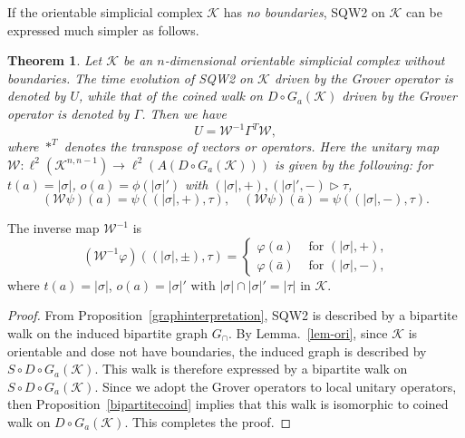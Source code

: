 \documentclass[a4paper,12pt]{article}
\newtheorem{theorem}[definition]{Theorem}
\numberwithin{equation}{section}
\begin{document}
If the orientable simplicial complex $\mathcal{K}$ has {\em no boundaries}, SQW2 on $\mathcal{K}$ can be expressed much simpler as follows.

\begin{theorem}
\label{thm-equiv-duplicate}
Let $\mathcal{K}$ be an $n$-dimensional orientable simplicial complex without boundaries. 
The time evolution of SQW2 on $\mathcal{K}$ driven by the Grover operator is denoted by $U$,
while that of the coined walk on $D\circ G_a(\mathcal{K})$ driven by the Grover operator is denoted by $\Gamma$. 
Then we have 
\begin{equation*}
U=\mathcal{W}^{-1}\Gamma^T \mathcal{W},
\end{equation*}
where $\ast^T$ denotes the transpose of vectors or operators. %
Here the unitary map $\mathcal{W}:\ell^2(\mathcal{K}^{n,n-1})\to \ell^2(A(D\circ G_a(\mathcal{K})))$ is given by the following: 
for $t(a)=|\sigma|$, $o(a)=\phi(|\sigma|')$ with $(|\sigma|,+),(|\sigma|',-) \triangleright \tau$, 
\begin{equation*} 
(\mathcal{W}\psi)(a) = \psi( (|\sigma|,+), \tau), \quad (\mathcal{W}\psi)(\bar{a}) = \psi( (|\sigma|,-), \tau).
\end{equation*}
\end{theorem}
The inverse map $\mathcal{W}^{-1}$ is 
\begin{equation*}
(\mathcal{W}^{-1}\varphi)((|\sigma|,\pm),\tau) 
= \begin{cases} 
	 \varphi(a) & \text{ for $(|\sigma|, +)$,} \\ 
	 \varphi(\bar{a}) & \text{ for $(|\sigma|, -)$,} 
\end{cases}
\end{equation*}
where $t(a)=|\sigma|$, $o(a)=|\sigma|'$ with $|\sigma|\cap |\sigma|'=|\tau|$ in $\mathcal{K}$. 
%
\begin{proof}
From Proposition~\ref{graphinterpretation}, SQW2 is described by a bipartite walk on the induced bipartite graph $G_\cap$. 
By Lemma.~\ref{lem-ori}, since $\mathcal{K}$ is orientable and dose not have boundaries, the induced graph is described by $S\circ D\circ G_a(\mathcal{K})$. 
This walk is therefore expressed by a bipartite walk on $S\circ D \circ G_a(\mathcal{K})$. 
Since we adopt the Grover operators to local unitary operators, then Proposition~\ref{bipartitecoind} implies that this walk is isomorphic to 
coined walk on $D \circ G_a(\mathcal{K})$. 
This completes the proof. 
\end{proof}
\end{document}
